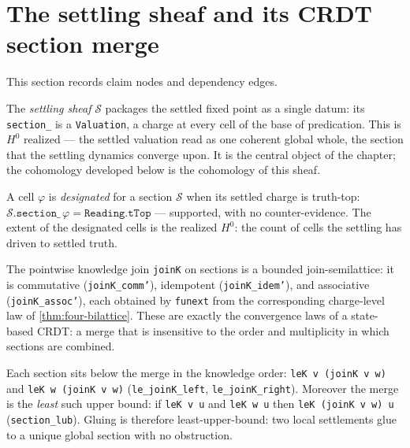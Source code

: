 \section{The settling sheaf and its CRDT section merge}

This section records claim nodes and dependency edges.

\begin{proposition}\label{thm:settling-sheaf}\leanok{}
The \emph{settling sheaf} $\mathcal{S}$ packages the settled fixed point as a single datum: its \texttt{section\_} is a \texttt{Valuation}, a charge at every cell of the base of predication. This is $H^0$ realized --- the settled valuation read as one coherent global whole, the section that the settling dynamics converge upon. It is the central object of the chapter; the cohomology developed below is the cohomology of this sheaf.
\end{proposition}
\begin{proposition}\label{thm:sheaf-designated}\leanok{}
A cell $\varphi$ is \emph{designated} for a section $\mathcal{S}$ when its settled charge is truth-top: $\mathcal{S}.\texttt{section\_}\,\varphi = \texttt{Reading.tTop}$ --- supported, with no counter-evidence. The extent of the designated cells is the realized $H^0$: the count of cells the settling has driven to settled truth.
\end{proposition}
\begin{theorem}\label{thm:section-merge-crdt}\leanok{}
The pointwise knowledge join \texttt{joinK} on sections is a bounded join-semilattice: it is commutative (\texttt{joinK\_comm'}), idempotent (\texttt{joinK\_idem'}), and associative (\texttt{joinK\_assoc'}), each obtained by \texttt{funext} from the corresponding charge-level law of \cref{thm:four-bilattice}. These are exactly the convergence laws of a state-based CRDT: a merge that is insensitive to the order and multiplicity in which sections are combined.
\end{theorem}
\begin{lemma}\label{thm:section-lub}\leanok{}
Each section sits below the merge in the knowledge order: \texttt{leK v (joinK v w)} and \texttt{leK w (joinK v w)} (\texttt{le\_joinK\_left}, \texttt{le\_joinK\_right}). Moreover the merge is the \emph{least} such upper bound: if \texttt{leK v u} and \texttt{leK w u} then \texttt{leK (joinK v w) u} (\texttt{section\_lub}). Gluing is therefore least-upper-bound: two local settlements glue to a unique global section with no obstruction.
\end{lemma}
